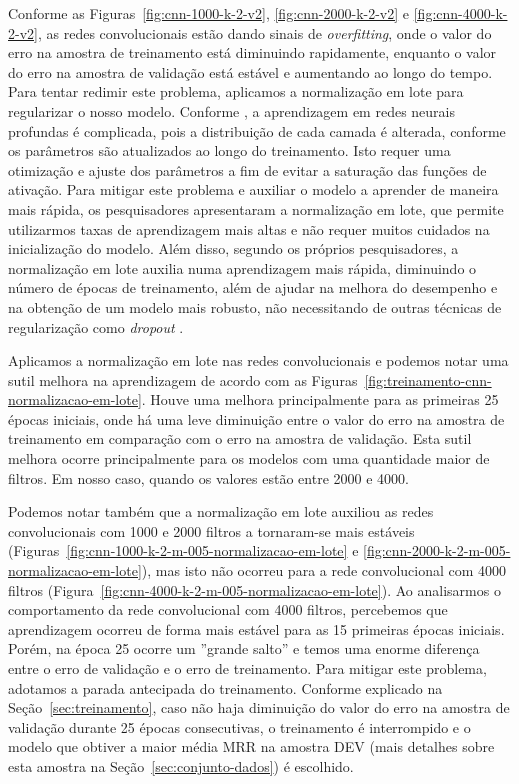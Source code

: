 Conforme as Figuras~\ref{fig:cnn-1000-k-2-v2}, \ref{fig:cnn-2000-k-2-v2} e \ref{fig:cnn-4000-k-2-v2}, as redes convolucionais estão dando sinais de \textit{overfitting}, onde o valor do erro na amostra de treinamento está diminuindo rapidamente, enquanto o valor do erro na amostra de validação está estável e aumentando ao longo do tempo. Para tentar redimir este problema, aplicamos a normalização em lote para regularizar o nosso modelo. Conforme \cite{sergey-batch-normalization-2015}, a aprendizagem em redes neurais profundas é complicada, pois a distribuição de cada camada é alterada, conforme os parâmetros são atualizados ao longo do treinamento. Isto requer uma otimização e ajuste dos parâmetros a fim de evitar a saturação das funções de ativação. Para mitigar este problema e auxiliar o modelo a aprender de maneira mais rápida, os pesquisadores apresentaram a normalização em lote, que permite utilizarmos taxas de aprendizagem mais altas e não requer muitos cuidados na inicialização do modelo. Além disso, segundo os próprios pesquisadores, a normalização em lote auxilia numa aprendizagem mais rápida, diminuindo o número de épocas de treinamento, além de ajudar na melhora do desempenho e na obtenção de um modelo mais robusto, não necessitando de outras técnicas de regularização como \textit{dropout} \citep{sergey-batch-normalization-2015}.

Aplicamos a normalização em lote nas redes convolucionais e podemos notar uma sutil melhora na aprendizagem de acordo com as Figuras~\ref{fig:treinamento-cnn-normalizacao-em-lote}. Houve uma melhora principalmente para as primeiras 25 épocas iniciais, onde há uma leve diminuição entre o valor do erro na amostra de treinamento em comparação com o erro na amostra de validação. Esta sutil melhora ocorre principalmente para os modelos com uma quantidade maior de filtros. Em nosso caso, quando os valores estão entre 2000 e 4000.

Podemos notar também que a normalização em lote auxiliou as redes convolucionais com 1000 e 2000 filtros a tornaram-se mais estáveis (Figuras~\ref{fig:cnn-1000-k-2-m-005-normalizacao-em-lote} e \ref{fig:cnn-2000-k-2-m-005-normalizacao-em-lote}), mas isto não ocorreu para a rede convolucional com 4000 filtros (Figura~\ref{fig:cnn-4000-k-2-m-005-normalizacao-em-lote}). Ao analisarmos o comportamento da rede convolucional com 4000 filtros, percebemos que aprendizagem ocorreu de forma mais estável para as 15 primeiras épocas iniciais. Porém, na época 25 ocorre um ''grande salto'' e temos uma enorme diferença entre o erro de validação e o erro de treinamento. Para mitigar este problema, adotamos a parada antecipada do treinamento. Conforme explicado na Seção~\ref{sec:treinamento}, caso não haja diminuição do valor do erro na amostra de validação durante 25 épocas consecutivas, o treinamento é interrompido e o modelo que obtiver a maior média MRR na amostra DEV (mais detalhes sobre esta amostra na Seção~\ref{sec:conjunto-dados}) é escolhido.

